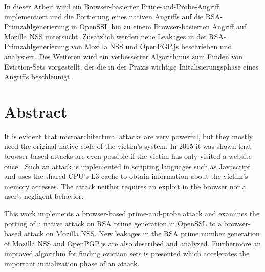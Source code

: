In dieser Arbeit wird ein Browser-basierter Prime-and-Probe-Angriff implementiert und die Portierung eines nativen Angriffs auf die RSA-Primzahlgenerierung \cite{RSAKeyGeneration2} in OpenSSL hin zu einem Browser-basierten Angriff auf Mozilla NSS untersucht.
Zusätzlich werden neue Leakages in der RSA-Primzahlgenerierung von Mozilla NSS und OpenPGP.js beschrieben und analysiert.
Des Weiteren wird ein verbesserter Algorithmus zum Finden von Eviction-Sets vorgestellt, der die in der Praxis wichtige Initalisierungsphase eines Angriffs beschleunigt. 


{\let\cleardoublepage\relax \chapter*{Abstract}}

It is evident that microarchitectural attacks are very powerful, but they mostly need the original native code of the victim's system. 
In 2015 it was shown that browser-based attacks are even possible if the victim has only visited a website once \cite{TheSpyInTheSandbox}.
Such an attack is implemented in scripting languages such as Javascript and uses the shared CPU's L3 cache to obtain information about the victim's memory accesses.
The attack neither requires an exploit in the browser nor a user's negligent behavior.%

This work implements a browser-based prime-and-probe attack and examines the porting of a native attack on RSA prime generation \cite{RSAKeyGeneration2} in OpenSSL to a browser-based attack on Mozilla NSS.
New leakages in the RSA prime number generation of Mozilla NSS and OpenPGP.js are also described and analyzed.
Furthermore an improved algorithm for finding eviction sets is presented which accelerates the important initialization phase of an attack.